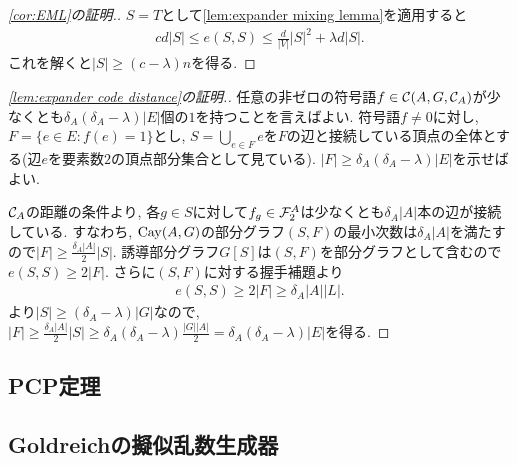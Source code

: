 \begin{proof}[\cref{cor:EML}の証明.]
    $S=T$として\cref{lem:expander mixing lemma}を適用すると
    \begin{align*}
        cd|S| \leq e(S,S) \leq \frac{d}{|V|}|S|^2+\lambda d |S|.
    \end{align*}
    これを解くと$|S|\geq (c-\lambda)n$を得る.
\end{proof}
%
\begin{proof}[\cref{lem:expander code distance}の証明.]
    任意の非ゼロの符号語$f\in\mathcal{C}(A,G,\mathcal{C}_A)$が少なくとも$\delta_A(\delta_A-\lambda)|E|$個の$1$を持つことを言えばよい.
    符号語$f\neq 0$に対し, $F=\{e\in E\colon f(e)=1\}$とし, $S=\bigcup_{e\in F}e$を$F$の辺と接続している頂点の全体とする(辺$e$を要素数$2$の頂点部分集合として見ている).
    $|F|\geq\delta_A(\delta_A-\lambda)|E|$を示せばよい.

    $\mathcal{C}_A$の距離の条件より,
    各$g\in S$に対して$f_g\in\mathcal{F}_2^A$は少なくとも$\delta_A|A|$本の辺が接続している.
    すなわち, $\mathrm{Cay}(A,G)$の部分グラフ$(S,F)$の最小次数は$\delta_A|A|$を満たすので$|F|\geq \frac{\delta_A |A|}{2}|S|$.
    誘導部分グラフ$G[S]$は$(S,F)$を部分グラフとして含むので$e(S,S)\geq 2|F|$.
    さらに$(S,F)$に対する握手補題より
    \begin{align*}
        e(S,S)\geq 2|F|\geq \delta_A|A||L|.
    \end{align*}
%
    より$|S|\geq (\delta_A-\lambda)|G|$なので,
    $|F|\geq \frac{\delta_A|A|}{2}|S|\geq \delta_A(\delta_A-\lambda)\frac{|G||A|}{2}=\delta_A(\delta_A-\lambda)|E|$を得る.
\end{proof}


\subsection{PCP定理}

\subsection{Goldreichの擬似乱数生成器}

